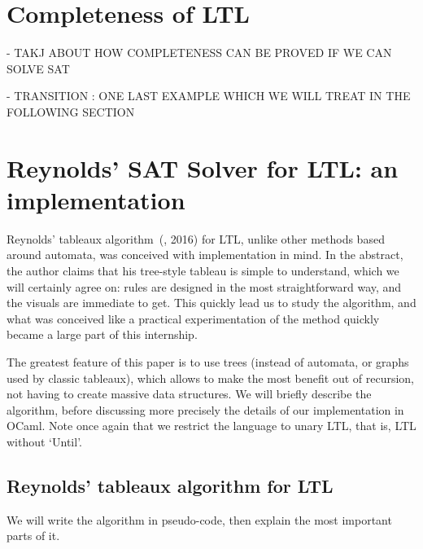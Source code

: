 \documentclass[11pt]{article}
\theoremstyle{definition}
\begin{document}
\section{Completeness of LTL}\label{SecLTLcomp}
 
- TAKJ ABOUT HOW COMPLETENESS CAN BE PROVED IF WE CAN SOLVE SAT



- TRANSITION : ONE LAST EXAMPLE WHICH WE WILL TREAT IN THE FOLLOWING SECTION

\section{Reynolds' SAT Solver for LTL: an implementation}\label{SecOcaml}

Reynolds' tableaux algorithm~(\cite{ReyLTL}, 2016) for LTL, unlike other methods based around automata, was conceived
with implementation in mind. In the abstract, the author claims that his tree-style tableau is simple to understand, which we will
certainly agree on: rules are designed in the most straightforward way, and the visuals are immediate to get. This quickly lead us 
to study the algorithm, and what was conceived like a practical experimentation of the method quickly became a large part of this internship.

The greatest feature of this paper is to use trees (instead of automata, or graphs used by classic tableaux), which allows to
make the most benefit out of recursion, not having to create massive data structures. We will briefly describe the algorithm, before discussing
more precisely the details of our implementation in OCaml. Note once again that we restrict the language to unary LTL,
that is, LTL without `Until'.


\subsection{Reynolds' tableaux algorithm for LTL}

We will write the algorithm in pseudo-code, then explain the most important parts of it.\\
\end{document}
